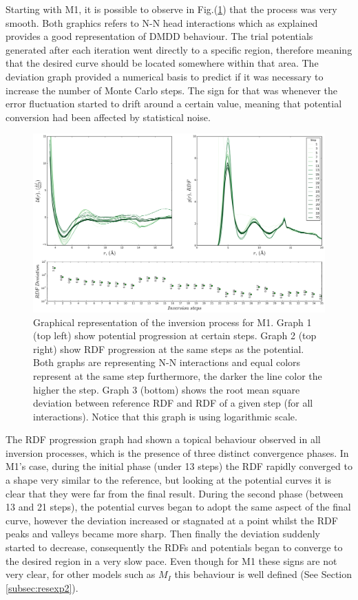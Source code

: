 \documentclass[10pt,a4paper,twoside]{article}
\begin{document}
 Starting with M1, it is possible to observe in Fig.(\ref{Fig:convM1}) that the process was very smooth. Both graphics refers to N-N head interactions which as explained provides a good representation of DMDD behaviour. The trial potentials generated after each iteration went directly to a specific region, therefore meaning that the desired curve should be located somewhere within that area. The deviation graph provided a numerical basis to predict if it was necessary to increase the number of Monte Carlo steps. The sign for that was whenever the error fluctuation started to drift around a certain value, meaning that potential conversion had been affected by statistical noise.
 
\begin{figure}[ht!]
  \begin{center}
	\includegraphics[width=1 \textwidth]{./graphs/ConvLow}
	\caption{Graphical representation of the inversion process for M1. Graph 1 (top left) show potential progression at certain steps. Graph 2 (top right) show RDF progression at the same steps as the potential. Both graphs are representing N-N interactions and equal colors represent at the same step furthermore, the darker the line color the higher the step. Graph 3 (bottom) shows the root mean square deviation between reference RDF and RDF of a given step (for all interactions). Notice that this graph is using logarithmic scale.}
	\label{Fig:convM1}
  \end{center}
\end{figure} 

The RDF progression graph had shown a topical behaviour observed in all inversion processes, which is the presence of three distinct convergence phases. In M1's case, during the initial phase (under 13 steps) the RDF rapidly converged to a shape very similar to the reference, but looking at the potential curves it is clear that they were far from the final result. During the second phase (between 13 and 21 steps), the potential curves began to adopt the same aspect of the final curve, however the deviation increased or stagnated at a point whilst the RDF peaks and valleys became more sharp. Then finally the deviation suddenly started to decrease, consequently the RDFs and potentials began to converge to the desired region in a very slow pace. Even though for M1 these signs are not very clear, for other models such as $M_{I}$ this behaviour is well defined (See Section \ref{subsec:resexp2}).
\end{document}
